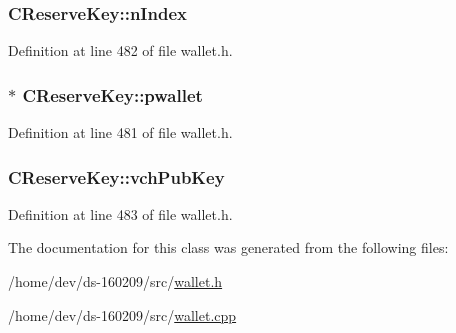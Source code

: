 \subsubsection[{n\+Index}]{ C\+Reserve\+Key\+::n\+Index\hspace{0.3cm}{\ttfamily [protected]}}\label{class_c_reserve_key_a16d05c9be039eb772f2daf412cca1991}


Definition at line 482 of file wallet.\+h.

\hypertarget{class_c_reserve_key_aab8a4052c0b9a4337248ae53e77c6115}{}
\subsubsection[{pwallet}]{$\ast$ C\+Reserve\+Key\+::pwallet\hspace{0.3cm}{\ttfamily [protected]}}\label{class_c_reserve_key_aab8a4052c0b9a4337248ae53e77c6115}


Definition at line 481 of file wallet.\+h.

\hypertarget{class_c_reserve_key_a2b252444577b6aca8b497c2207ff17a4}{}
\subsubsection[{vch\+Pub\+Key}]{ C\+Reserve\+Key\+::vch\+Pub\+Key\hspace{0.3cm}{\ttfamily [protected]}}\label{class_c_reserve_key_a2b252444577b6aca8b497c2207ff17a4}


Definition at line 483 of file wallet.\+h.



The documentation for this class was generated from the following files\+:\begin{DoxyCompactItemize}
\item 
/home/dev/ds-\/160209/src/\hyperlink{wallet_8h}{wallet.\+h}\item 
/home/dev/ds-\/160209/src/\hyperlink{wallet_8cpp}{wallet.\+cpp}\end{DoxyCompactItemize}
